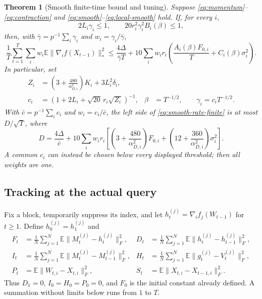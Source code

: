 \documentclass[11pt]{article}
\newtheorem{theorem}{Theorem}
\newcommand{\E}{\mathbb E}
\newcommand{\nuc}[1]{\lVert #1\rVert_*}
\newcommand{\frob}[1]{\lVert #1\rVert_F}
\newcommand{\avg}{\frac1N\sum_{j=1}^N}
\newcommand{\barc}{\bar c}
\newcommand{\bargamma}{\bar\gamma}
\begin{document}
\begin{theorem}[Smooth finite-time bound and tuning]\label{thm:smooth}
Suppose \eqref{eq:momentum}--\eqref{eq:contraction} and
\eqref{eq:smooth}--\eqref{eq:local-smooth} hold. If, for every $i$,
\begin{equation}\label{eq:small}
 2L_i\gamma_i\le1,\qquad
 20r_i^2\gamma_i^2B_i(\beta)\le1,
\end{equation}
then, with $\bargamma=p^{-1}\sum_i\gamma_i$ and
$w_i=\gamma_i/\bargamma$,
\begin{equation}\label{eq:smooth-rate-finite}
 \frac1T\sum_{t=1}^T\sum_i w_i
   \E\nuc{\nabla_i f(X_{t-1})}^2
 \le\frac{4\Delta}{\bargamma T}
 +10\sum_iw_i r_i\left(
       \frac{A_i(\beta)F_{0,i}}T+C_i(\beta)\sigma_i^2\right).
\end{equation}
In particular, set
\begin{align}
 Z_i&=\left(3+\frac{480}{\alpha_{D,i}^2}\right)K_i+3L_i^2\delta_i,\\
 c_i&=\left(1+2L_i+\sqrt{20}\,r_i\sqrt{Z_i}\right)^{-1},
 &\beta&=T^{-1/2},\qquad\gamma_i=c_iT^{-1/2}.
 \label{eq:smooth-tuning}
\end{align}
With $\barc=p^{-1}\sum_i c_i$ and $w_i=c_i/\barc$, the left side of
\eqref{eq:smooth-rate-finite} is at most $D/\sqrt T$, where
\begin{equation}\label{eq:smooth-constant}
 D=\frac{4\Delta}{\barc}+10\sum_iw_i r_i
 \left[\left(3+\frac{480}{\alpha_{D,i}^2}\right)F_{0,i}
 +\left(12+\frac{360}{\alpha_{D,i}^2}\right)\sigma_i^2\right].
\end{equation}
A common $c_i$ can instead be chosen below every displayed threshold;
then all weights are one.
\end{theorem}

\subsection{Tracking at the actual query}

Fix a block, temporarily suppress its index, and let
$h_t^{(j)}=\nabla_i f_j(W_{t-1})$ for $t\ge1$.
Define $h_0^{(j)}=h_1^{(j)}$ and
\begin{align}
 F_t&=\avg\E\frob{M_t^{(j)}-h_t^{(j)}}^2,
 &D_t&=\avg\E\frob{h_t^{(j)}-h_{t-1}^{(j)}}^2,\\
 I_t&=\avg\E\frob{M_t^{(j)}-M_{t-1}^{(j)}}^2,
 &H_t&=\avg\E\frob{g_t^{(j)}-V_t^{(j)}}^2,\\
 P_t&=\E\frob{W_{t,i}-X_{t,i}}^2,
 &S_t&=\E\frob{X_{t,i}-X_{t-1,i}}^2.
\end{align}
Thus $D_1=0$, $I_0=H_0=P_0=0$, and $F_0$ is the initial constant
already defined. A summation without limits below runs from $1$ to $T$.
\end{document}

